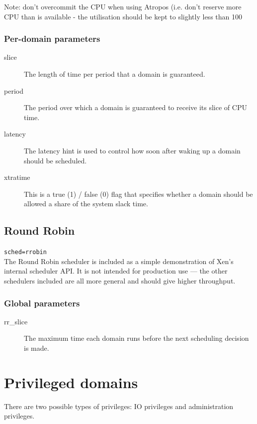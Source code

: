 \documentclass[11pt,twoside,final,openright]{xenstyle}
\begin{document}
{Note: don't overcommit the CPU when using Atropos (i.e. don't reserve
more CPU than is available - the utilisation should be kept to
slightly less than 100%

\subsection{Per-domain parameters}

\begin{description}
\item[slice]
  The length of time per period that a domain is guaranteed.
\item[period]
  The period over which a domain is guaranteed to receive
  its slice of CPU time.
\item[latency]
  The latency hint is used to control how soon after
  waking up a domain should be scheduled.
\item[xtratime]
  This is a true (1) / false (0) flag that specifies whether
  a domain should be allowed a share of the system slack time.
\end{description}

\section{Round Robin}

{\tt sched=rrobin } \\

The Round Robin scheduler is included as a simple demonstration of
Xen's internal scheduler API.  It is not intended for production use
--- the other schedulers included are all more general and should give
higher throughput.

\subsection{Global parameters}

\begin{description}
\item[rr\_slice]
  The maximum time each domain runs before the next
  scheduling decision is made.
\end{description}

\chapter{Privileged domains}

There are two possible types of privileges:  IO privileges and
administration privileges.

}
\end{document}
